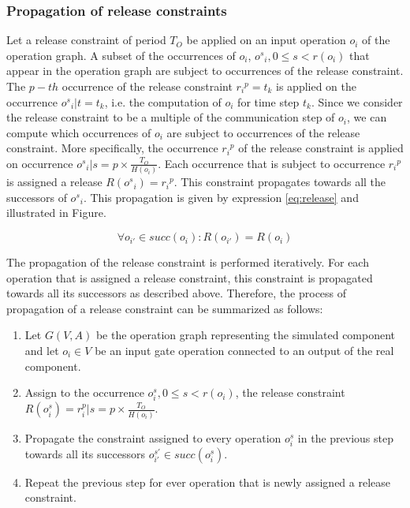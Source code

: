 \subsubsection{Propagation of release constraints}

Let a release constraint of period $T_O$ be applied on an input operation $o_i$ of the operation graph. A subset of the occurrences of $o_i$, ${o^s}_i, 0 \leq s < r(o_i)$ that appear in the operation graph are subject to occurrences of the release constraint. The $p-th$ occurrence of the release constraint ${r_i}^p = t_k$ is applied on the occurrence ${o^s}_i | t = t_k$, i.e. the computation of ${o_i}$ for time step $t_k$. Since we consider the release constraint to be a multiple of the communication step of ${o_i}$, we can compute which occurrences of ${o_i}$ are subject to occurrences of the release constraint. More specifically, the occurrence ${r_i}^p$ of the release constraint is applied on occurrence ${o^s}_i | s = p \times \frac{T_O}{H(o_i)}$. Each occurrence that is subject to occurrence ${r_i}^p$ is assigned a release $R({o^s}_i) = {r_i}^p$. This constraint propagates towards all the successors of ${o^s}_i$. This propagation is given by expression \ref{eq:release} and illustrated in Figure.

\begin{equation}
\forall o_{i'} \in succ(o_i): R(o_{i'}) = R(o_i)
\label{eq:release}
\end{equation}

The propagation of the release constraint is performed iteratively. For each operation that is assigned a release constraint, this constraint is propagated towards all its successors as described above. Therefore, the process of propagation of a release constraint can be summarized as follows:

\begin{enumerate}
\item Let $G(V,A)$ be the operation graph representing the simulated component and let $o_i \in  V$ be an input gate operation connected to an output of the real component.
\item Assign to the occurrence $o_i^s, 0 \leq s < r(o_i)$, the release constraint $R(o_i^s) = r_i^p | s = p \times \frac{T_O}{H(o_i)}$.
\item Propagate the constraint assigned to every operation $o_i^s$ in the previous step towards all its successors $o_{i'}^{s'} \in succ(o_i^s)$.
\item Repeat the previous step for ever operation that is newly assigned a release constraint.
\end{enumerate}

